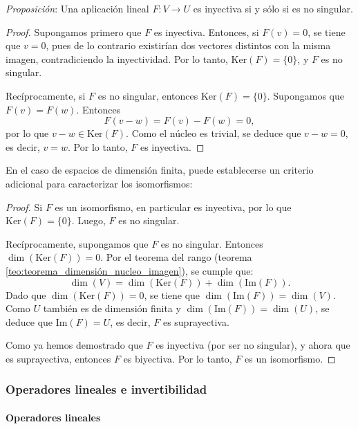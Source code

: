 \textit{Proposición}: Una aplicación lineal \(F: V \rightarrow U\) es inyectiva si y sólo si es no singular.

\begin{proof}
Supongamos primero que \(F\) es inyectiva. Entonces, si \(F(v) = 0\), se tiene que \(v = 0\), pues de lo contrario existirían dos vectores distintos con la misma imagen, contradiciendo la inyectividad. Por lo tanto, \(\text{Ker}(F) = \{0\}\), y \(F\) es no singular.

Recíprocamente, si \(F\) es no singular, entonces \(\text{Ker}(F) = \{0\}\). Supongamos que \(F(v) = F(w)\). Entonces
\[
F(v - w) = F(v) - F(w) = 0,
\]
por lo que \(v - w \in \text{Ker}(F)\). Como el núcleo es trivial, se deduce que \(v - w = 0\), es decir, \(v = w\). Por lo tanto, \(F\) es inyectiva.
\end{proof}

En el caso de espacios de dimensión finita, puede establecerse un criterio adicional para caracterizar los isomorfismos:


\begin{proof}
Si \(F\) es un isomorfismo, en particular es inyectiva, por lo que \(\text{Ker}(F) = \{0\}\). Luego, \(F\) es no singular.

Recíprocamente, supongamos que \(F\) es no singular. Entonces \(\dim(\text{Ker}(F)) = 0\). Por el teorema del rango (teorema \ref{teo:teorema_dimensión_nucleo_imagen}), se cumple que:
\[
\dim(V) = \dim(\text{Ker}(F)) + \dim(\text{Im}(F)).
\]
Dado que \(\dim(\text{Ker}(F)) = 0\), se tiene que \(\dim(\text{Im}(F)) = \dim(V)\). Como \(U\) también es de dimensión finita y \(\dim(\text{Im}(F)) = \dim(U)\), se deduce que \(\text{Im}(F) = U\), es decir, \(F\) es suprayectiva.

Como ya hemos demostrado que \(F\) es inyectiva (por ser no singular), y ahora que es suprayectiva, entonces \(F\) es biyectiva. Por lo tanto, \(F\) es un isomorfismo.
\end{proof}

\subsubsection{Operadores lineales e invertibilidad}

\paragraph{Operadores lineales}
\label{sec:operadores_lineales}

